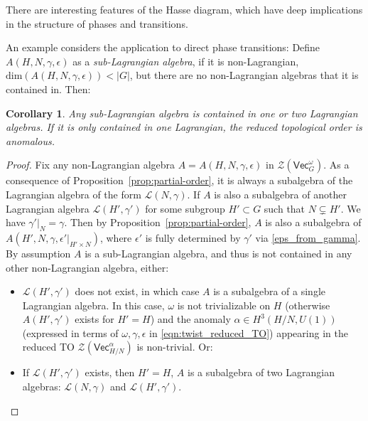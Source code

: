 \documentclass[aps,twocolumn,prx,floatfix,preprintnumbers, nofootinbib,10pt]{revtex4-2}
\numberwithin{equation}{section}
\newtheorem{corollary}[theorem]{Corollary}
\theoremstyle{definition}
\newcommand{\cL}{\mathcal{L}}
\newcommand{\cZ}{\mathcal{Z}}
\renewcommand{\Vec}{\mathsf{Vec}}
\renewcommand{\dim}{\text{dim}}
\newcommand{\eps}{\epsilon}
\begin{document}
There are interesting features of the Hasse diagram, which have deep implications in the structure of phases and transitions. 

An example considers the application to direct phase transitions: 
Define $A (H, N, \gamma, \epsilon)$ as a \emph{sub-Lagrangian algebra}, if it is non-Lagrangian,   $\dim (A (H, N, \gamma, \epsilon)) < |G|$, but there are no non-Lagrangian algebras that it is contained in. Then:
\begin{corollary}
Any sub-Lagrangian algebra is contained in one or two Lagrangian algebras. If it is only contained in one Lagrangian, the reduced topological order is anomalous. 
\end{corollary}
\begin{proof}
    Fix any non-Lagrangian algebra $A=A(H, N, \gamma, \eps)$ in $\cZ(\Vec_G^\omega)$. As a consequence of Proposition~\ref{prop:partial-order}, it is always a subalgebra of the Lagrangian algebra of the form $\cL(N, \gamma)$.  
    If $A$ is also a subalgebra of another Lagrangian algebra $\cL(H', \gamma')$ for some subgroup $H'\subset G$ such that $N \subsetneq H'$. We have $\gamma'|_N=\gamma$. Then by Proposition~\ref{prop:partial-order}, $A$ is also a subalgebra of $A(H', N, \gamma, \eps'|_{H'\times N})$, where $\eps'$ is fully determined by $\gamma'$ via \eqref{eps_from_gamma}. 
By assumption $A$ is a sub-Lagrangian algebra, and thus is not contained in any other non-Lagrangian algebra, either: 

\begin{itemize}[itemsep=3.5pt,topsep=2ex, parsep=2pt, partopsep=5pt,leftmargin=2.ex]
    \item $\cL(H', \gamma')$ does not exist, in which case $A$ is a subalgebra of a single Lagrangian algebra. In this case, $\omega$ is not trivializable on $H$ (otherwise $A(H',\gamma')$ exists for $H'=H$) and the anomaly $\alpha\in H^3(H/N, U(1))$ (expressed in terms of $\omega, \gamma, \eps$ in \eqref{eqn:twist_reduced_TO}) appearing in the reduced TO $\cZ(\Vec_{H/N}^{\alpha})$ is non-trivial. Or:
    \item If $\cL(H', \gamma')$ exists, then $H'=H$, $A$ is a subalgebra of two  Lagrangian algebras: $\cL(N, \gamma)$ and $\cL(H', \gamma')$.
\end{itemize}
\end{proof}
\end{document}
